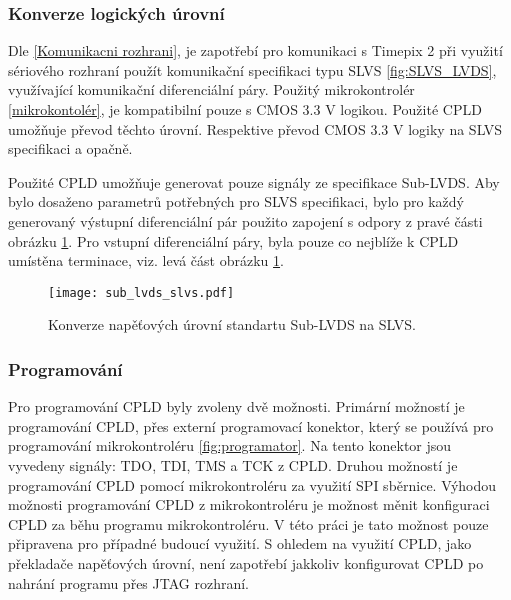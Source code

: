 	\subsubsection{Konverze logických úrovní}
	\label{CPLD konverze}
	Dle \ref{Komunikacni rozhrani}, je zapotřebí pro komunikaci s Timepix 2 při využití sériového rozhraní použít komunikační specifikaci typu SLVS \ref{fig:SLVS_LVDS}, využívající komunikační diferenciální páry. Použitý mikrokontrolér \ref{mikrokontolér}, je kompatibilní pouze s CMOS 3.3 V logikou. Použité CPLD umožňuje převod těchto úrovní. Respektive převod CMOS 3.3 V logiky na SLVS specifikaci a opačně.
	\par Použité CPLD umožňuje generovat pouze signály ze specifikace Sub-LVDS. Aby bylo dosaženo parametrů potřebných pro SLVS specifikaci, bylo pro každý generovaný výstupní diferenciální pár použito zapojení s odpory z pravé části obrázku \ref{fig:sub_lvds_slvs}. Pro vstupní diferenciální páry, byla pouze co nejblíže k CPLD umístěna terminace, viz. levá část obrázku \ref{fig:sub_lvds_slvs}.
\begin{comment} 
	Programová implementace generování diferenciálních signálů pro MachXO2 obsahující pouze část architektury pro konverzi logických úrovní je zobrazena v ukázkovém kódu \ref{kod_vhdl}.
\begin{lstlisting}[frame=single, language=VHDL, caption={Ukázkový kód ve VHDL pro CPLD}, label=kod_vhdl]
	architecture behavioral of t2m is
	begin
	-- CMOS -> SLVS
	DATA_IN_SLVS	<= DATA_IN;
	nCS_IN_SLVS	<= nCS_IN;
	DCLOCK_IN_SLVS	<= DCLOCK_IN;
	MCLOCK_SLVS	<= MCLOCK;
	-- SLVS -> CMOS
	DATA_OUT	<= DATA_OUT_SLVS;
	DCLOCK_OUT	<= DCLOCK_OUT_SLVS;
	nCS_OUT		<= nCS_OUT_SLVS;
	end architecture behavioral ;
\end{lstlisting}
\end{comment}
	
	\begin{figure}[h!]
	\centering
	\captionsetup{justification=centering}
	\texttt{[image: sub\_lvds\_slvs.pdf]}
	\caption{Konverze napěťových úrovní standartu Sub-LVDS na SLVS.} 
	\label{fig:sub_lvds_slvs}
	\end{figure}
	\subsubsection{Programování}
	Pro programování CPLD byly zvoleny dvě možnosti. Primární možností je programování CPLD, přes externí programovací konektor, který se používá pro programování mikrokontroléru \ref{fig:programator}. Na tento konektor jsou vyvedeny signály: TDO, TDI, TMS a TCK z CPLD. Druhou možností je programování CPLD pomocí mikrokontroléru za využití SPI sběrnice. Výhodou možnosti programování CPLD z mikrokontroléru je možnost měnit konfiguraci CPLD za běhu programu mikrokontroléru. V této práci je tato možnost pouze připravena pro případné budoucí využití. S ohledem na využití CPLD, jako překladače napěťových úrovní, není zapotřebí jakkoliv konfigurovat CPLD po nahrání programu přes JTAG rozhraní.
